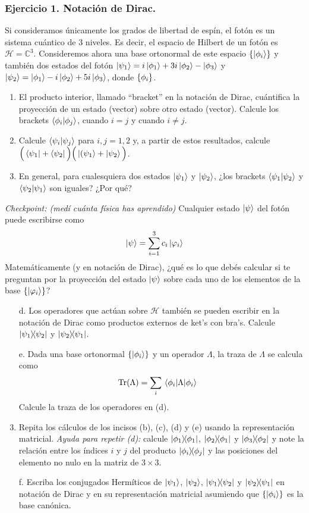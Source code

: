 \documentclass[11pt,letterpaper]{article}
\begin{document}
\subsubsection*{Ejercicio 1. Notación de Dirac.}
Si consideramos únicamente los grados de libertad de espín, el fotón es un 
sistema cuántico de 3 niveles. Es decir, el espacio de Hilbert de un fotón es 
$\mathcal{H}=\mathbb{C}^3$. Consideremos ahora una base ortonormal 
de este espacio $\qty{\ket{\phi_i}}$ y también dos estados del 
fotón $\ket{\psi_1}=i\ket{\phi_1}+3i\ket{\phi_2}-\ket{\phi_3}$
y $\ket{\psi_2}=\ket{\phi_1}-i\ket{\phi_2}+5i\ket{\phi_3}$, donde $\qty{\phi_i}$.
\begin{enumerate}
\item El producto interior, llamado ``bracket'' en la notación de Dirac, 
cuántifica la proyección de un estado (vector) sobre otro estado
(vector). Calcule los brackets
$\braket{\phi_i}{\phi_j}$, cuando $i=j$ y cuando $i\ne j$.
\item Calcule $\braket{\psi_i}{\psi_j}$ para $i,j=1,2$ y, a partir de estos
resultados, calcule 
$\Big(\bra{\psi_1}+\bra{\psi_2}\Big)\Big(\ket{(\psi_1}+\ket{\psi_2}\Big)$.
\item En general, para cualesquiera dos estados $\ket{\psi_1}$ y
$\ket{\psi_2}$, ¿los brackets $\braket{\psi_1}{\psi_2}$ y
$\braket{\psi_2}{\psi_1}$ son iguales? ¿Por qué?
\end{enumerate}
\textit{Checkpoint: (medí cuánta física has aprendido)} Cualquier estado $\ket{\psi}$
del fotón puede escribirse como
\begin{align}
\ket{\psi}=\sum_{i=1}^3c_i\ket{\varphi_i}
\end{align}
Matemáticamente (y en notación de Dirac), ¿qué es lo que debés calcular si
te preguntan por la proyección del estado $\ket{\psi}$ sobre cada uno de los 
elementos de la base $\qty{\ket{\varphi_i}}$?
\begin{enumerate}
\item[d.]
Los operadores que actúan sobre $\mathcal{H}$ también se pueden 
escribir en la notación de Dirac como productos externos de ket's con bra's.
Calcule $\dyad{\psi_1}{\psi_2}$ y $\dyad{\psi_2}{\psi_1}$.
\item[e.] Dada una base ortonormal $\qty{\ket{\phi_i}}$
y un operador $\Lambda$, la traza de $\Lambda$ se calcula como
\begin{align}
\Tr (\Lambda)&=\sum_i \matrixel{\phi_i}{\Lambda}{\phi_i}
\end{align}
Calcule la traza de los operadores en (d).
\item 
Repita los cálculos de los incisos (b), (c), (d) y (e) usando la representación 
matricial. \textit{Ayuda para repetir (d):} calcule $\dyad{\phi_1}{\phi_1}$, 
$\dyad{\phi_2}{\phi_1}$ y $\dyad{\phi_3}{\phi_2}$ y note la relación entre 
los índices $i$ y $j$ del producto $\dyad{\phi_i}{\phi_j}$ y las posiciones del
elemento no nulo en la matriz de $3\times 3$.
\item[f.] Escriba los conjugados Hermíticos de $\ket{\psi_1}$, $\ket{\psi_2}$,
$\dyad{\psi_1}{\psi_2}$ y $\dyad{\psi_2}{\psi_1}$ en notación de Dirac
y en su representación matricial asumiendo que $\qty{\ket{\phi_i}}$ es la base
canónica.
\end{enumerate}
\end{document}
